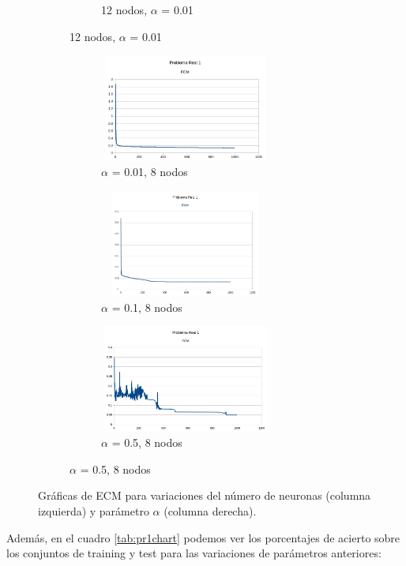 \documentclass[spanish]{assignment}
\begin{document}
\begin{figure}[ht!]
\begin{subfigure}[t!]{0.5\textwidth}
\begin{subfigure}[t!]{\textwidth}
				\caption{12 nodos, $\alpha$ = 0.01}
			\end{subfigure}
		\end{subfigure}
		\begin{subfigure}[t!]{0.5\textwidth}
			\begin{subfigure}[t!]{\textwidth}
				\centering
				\includegraphics[width=160pt, height=100pt]{PR1h2.png}
				\caption{$\alpha$ = 0.01, 8 nodos}				
			\end{subfigure}
			\begin{subfigure}[t!]{\textwidth}
				\centering
				\includegraphics[width=160pt, height=100pt]{PR1a1.png}
				\caption{$\alpha$ = 0.1, 8 nodos}				
			\end{subfigure}
			\begin{subfigure}[t!]{\textwidth}
				\centering
				\includegraphics[width=160pt, height=100pt]{PR1a2.png}
				\caption{$\alpha$ = 0.5, 8 nodos}				
			\end{subfigure}
		\end{subfigure}
		\caption{%
			Gráficas de ECM para variaciones del número de neuronas (columna izquierda) y parámetro $\alpha$ (columna derecha).
		}%
		\label{fig:ECM_mosaic}
	\end{figure}
	
	Además, en el cuadro \ref{tab:pr1chart} podemos ver los porcentajes de acierto sobre los conjuntos de training y test para las variaciones de parámetros anteriores:
	
\end{document}
